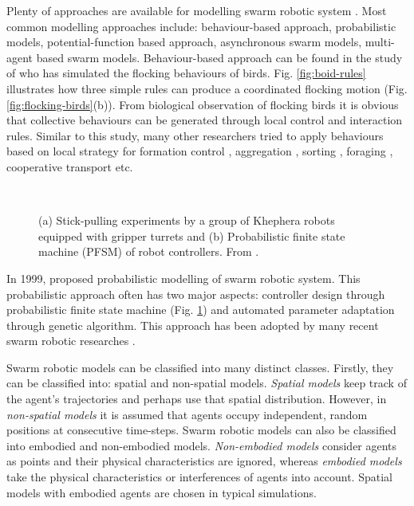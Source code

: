 Plenty of approaches are available for modelling swarm robotic system \cite{Gazi+2006}. Most common modelling approaches include: behaviour-based approach, probabilistic models, potential-function based approach, asynchronous swarm models, multi-agent based swarm models. Behaviour-based approach can be found in the study of  who has simulated the flocking behaviours of birds. Fig. \ref{fig:boid-rules} illustrates how three simple rules can produce a coordinated flocking motion (Fig. \ref{fig:flocking-birds}(b)). From biological observation of flocking birds  it is obvious that collective behaviours can be generated through local control and interaction rules. Similar to this study, many other researchers tried to apply behaviours based on local strategy for formation control \cite{Balch+1998}, aggregation \cite{Mataric1995}, sorting \cite{Melhuish+1998}, foraging \cite{Liu+2007}, cooperative transport \cite{Kube1997} etc.
\begin{figure}
\centering
{} 
\hspace{0.5cm}\\
\caption{ (a) Stick-pulling experiments by a group of Khephera robots equipped with gripper turrets and (b) Probabilistic finite state machine (PFSM) of robot controllers. From \protect{}.}
\label{fig:stick-pulling-expt}
\end{figure}

In 1999,  proposed probabilistic modelling of swarm robotic system. This probabilistic approach often has two major aspects: controller design through probabilistic finite state machine (Fig. \ref{fig:stick-pulling-expt}) and automated parameter adaptation through genetic algorithm. This approach has been adopted by many recent swarm robotic researches \cite{Agassounon+2004,Lerman+2005,Liu+2007b}.
 
Swarm robotic models can be classified into many distinct classes. Firstly, they can be classified into: spatial and non-spatial models. {\em Spatial models} keep track of the agent's trajectories and perhaps use that spatial distribution. However, in {\em non-spatial models} it is assumed that agents occupy independent, random positions at consecutive time-steps. Swarm robotic models can also be classified into embodied and non-embodied models. {\em Non-embodied models} consider agents  as points and their physical characteristics are ignored, whereas {\em embodied models} take the physical characteristics or interferences of agents into account. Spatial models with embodied agents are chosen in typical simulations.

